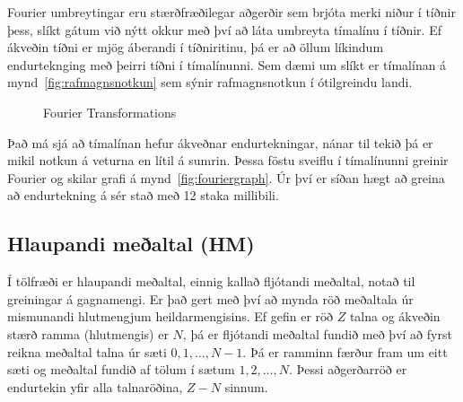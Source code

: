 \documentclass{article}
\begin{document}
Fourier umbreytingar eru stærðfræðilegar aðgerðir
sem brjóta merki niður í tíðnir þess, slíkt gátum við nýtt okkur með því að láta
umbreyta tímalínu í tíðnir. 
Ef ákveðin tíðni er mjög áberandi í tíðniritinu, þá er að öllum líkindum endurteknging með þeirri tíðni í tímalínunni. 
Sem dæmi um slíkt er tímalínan á mynd~\ref{fig:rafmagnsnotkun} sem sýnir rafmagnsnotkun í ótilgreindu landi.


\begin{figure}[H]
  \centering
  \caption{Fourier Transformations}
  \label{fig:fourier}
\end{figure}

Það má sjá að tímalínan hefur ákveðnar endurtekningar,
nánar til tekið þá er mikil notkun á veturna en lítil á
sumrin.
Þessa föstu sveiflu í tímalínunni greinir Fourier og
skilar grafi á mynd~\ref{fig:fouriergraph}. 
Úr því er síðan hægt að greina að endurtekning á sér stað með 12 staka millibili.




\subsection{Hlaupandi meðaltal (HM)}
\label{sec:running_average}
Í tölfræði er hlaupandi meðaltal, einnig kallað
fljótandi meðaltal, notað til greiningar á gagnamengi. 
Er það gert með því að mynda röð meðaltala úr
mismunandi hlutmengjum heildarmengisins.
Ef gefin er röð $Z$ talna og ákveðin stærð ramma
(hlutmengis) er $N$, þá er fljótandi meðaltal fundið
með því að fyrst reikna meðaltal 
talna úr sæti $0,1,\dots,N-1$. Þá er ramminn færður
fram um eitt sæti og meðaltal fundið af tölum í sætum
$1,2,\dots,N$. 
Þessi aðgerðarröð er endurtekin yfir alla talnaröðina,
$Z-N$ sinnum.  
\end{document}
